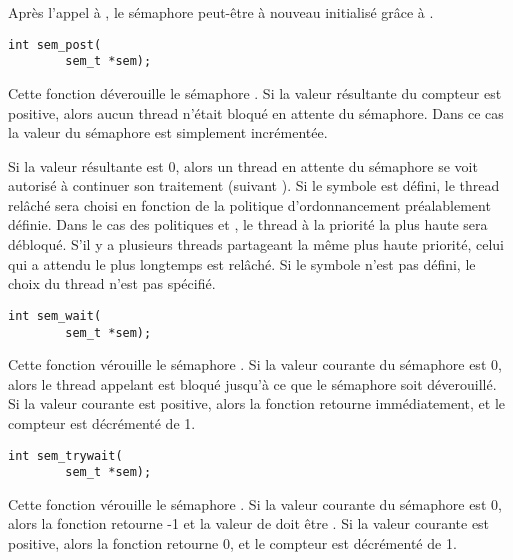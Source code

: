Après l'appel à , le sémaphore peut-être à nouveau initialisé grâce à .

\label{func:sem_post}

\begin{lstlisting}
int sem_post(
		sem_t *sem);
\end{lstlisting}

Cette fonction déverouille le sémaphore . Si la valeur résultante du compteur est positive, alors aucun thread n'était bloqué en attente du sémaphore. Dans ce cas la valeur du sémaphore est simplement incrémentée.

Si la valeur résultante est 0, alors un thread en attente du sémaphore se voit autorisé à continuer son traitement (suivant ). Si le symbole  est défini, le thread relâché sera choisi en fonction de la politique d'ordonnancement préalablement définie. Dans le cas des politiques  et , le thread à la priorité la plus haute sera débloqué. S'il y a plusieurs threads partageant la même plus haute priorité, celui qui a attendu le plus longtemps est relâché. Si le symbole  n'est pas défini, le choix du thread n'est pas spécifié.

\label{func:sem_wait}

\begin{lstlisting}
int sem_wait(
		sem_t *sem);
\end{lstlisting}

Cette fonction vérouille le sémaphore . Si la valeur courante du sémaphore est 0, alors le thread appelant est bloqué jusqu'à ce que le sémaphore soit déverouillé. Si la valeur courante est positive, alors la fonction retourne immédiatement, et le compteur est décrémenté de 1.


\label{func:sem_trywait}

\begin{lstlisting}
int sem_trywait(
		sem_t *sem);
\end{lstlisting}
Cette fonction vérouille le sémaphore . Si la valeur courante du sémaphore est 0, alors la fonction retourne -1 et la valeur de  doit être . Si la valeur courante est positive, alors la fonction retourne 0, et le compteur est décrémenté de 1.


\label{func:sem_getvalue}


